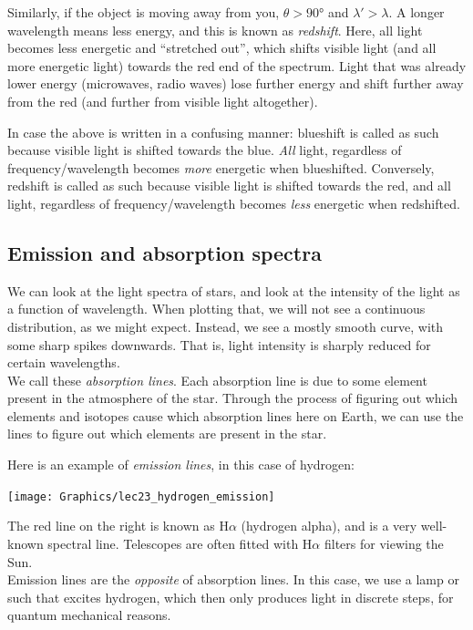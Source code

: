 \documentclass[8.01x]{subfiles}
\begin{document}
Similarly, if the object is moving away from you, $\theta > \ang{90}$ and $\lambda' > \lambda$. A longer wavelength means less energy, and this is known as \emph{redshift}. Here, all light becomes less energetic and ``stretched out'', which shifts visible light (and all more energetic light) towards the red end of the spectrum. Light that was already lower energy (microwaves, radio waves) lose further energy and shift further away from the red (and further from visible light altogether).

In case the above is written in a confusing manner: blueshift is called as such because visible light is shifted towards the blue. \emph{All} light, regardless of frequency/wavelength becomes \emph{more} energetic when blueshifted. Conversely, redshift is called as such because visible light is shifted towards the red, and all light, regardless of frequency/wavelength becomes \emph{less} energetic when redshifted.

\subsection{Emission and absorption spectra}

We can look at the light spectra of stars, and look at the intensity of the light as a function of wavelength. When plotting that, we will not see a continuous distribution, as we might expect. Instead, we see a mostly smooth curve, with some sharp spikes downwards. That is, light intensity is sharply reduced for certain wavelengths.\\
We call these \emph{absorption lines}. Each absorption line is due to some element present in the atmosphere of the star. Through the process of figuring out which elements and isotopes cause which absorption lines here on Earth, we can use the lines to figure out which elements are present in the star.

Here is an example of \emph{emission lines}, in this case of hydrogen:

\begin{center}
\texttt{[image: Graphics/lec23\_hydrogen\_emission]}
\end{center}

The red line on the right is known as H$\alpha$ (hydrogen alpha), and is a very well-known spectral line. Telescopes are often fitted with H$\alpha$ filters for viewing the Sun.\\
Emission lines are the \emph{opposite} of absorption lines. In this case, we use a lamp or such that excites hydrogen, which then only produces light in discrete steps, for quantum mechanical reasons.
\end{document}
